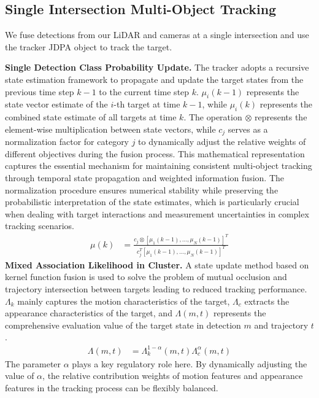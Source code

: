 \documentclass[journal,twoside,web]{ieeecolor}
\begin{document}
\subsection{Single Intersection Multi-Object Tracking}

We fuse detections from our LiDAR and cameras at a single intersection and use the tracker JDPA object to track the target.

\textbf{Single Detection Class Probability Update.}
The tracker adopts a recursive state estimation framework to propagate and update the target states from the previous time step \(k-1\) to the current time step \(k\).
\(\mu_i(k-1)\) represents the state vector estimate of the \(i\)-th target at time \(k-1\), while \(\mu_i(k)\) represents the combined state estimate of all targets at time \(k\).
The operation \(\otimes\) represents the element-wise multiplication between state vectors, while \(c_{j}\) serves as a normalization factor for category \(j\) to dynamically adjust the relative weights of different objectives during the fusion process.
This mathematical representation captures the essential mechanism for maintaining consistent multi-object tracking through temporal state propagation and weighted information fusion.
The normalization procedure ensures numerical stability while preserving the probabilistic interpretation of the state estimates, which is particularly crucial when dealing with target interactions and measurement uncertainties in complex tracking scenarios.
\begin{align}
	\mu(k) & = \frac{c_{j} \otimes [ \mu_1(k-1), \ldots, \mu_N(k-1) ]^T}{c_{j}^{T} [ \mu_1(k-1), \ldots, \mu_N(k-1) ]^T}
\end{align}
\textbf{Mixed Association Likelihood in Cluster.}
A state update method based on kernel function fusion is used to solve the problem of mutual occlusion and trajectory intersection between targets leading to reduced tracking performance.
\(\Lambda_{k}\) mainly captures the motion characteristics of the target, \(\Lambda_{c}\) extracts the appearance characteristics of the target, and \(\Lambda(m, t)\) represents the comprehensive evaluation value of the target state in detection \(m\) and trajectory \(t\).
\begin{align}
	\Lambda(m, t) & = \Lambda_{k}^{1-\alpha}(m, t) \Lambda_{c}^{\alpha}(m, t)
\end{align}
The parameter \(\alpha\) plays a key regulatory role here. By dynamically adjusting the value of \(\alpha\), the relative contribution weights of motion features and appearance features in the tracking process can be flexibly balanced.
\end{document}
